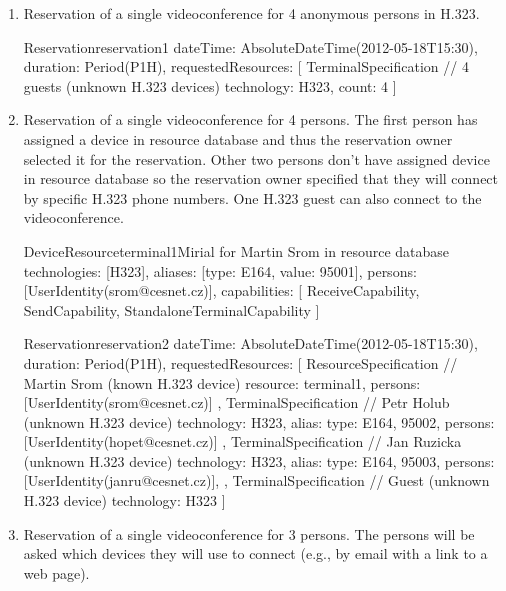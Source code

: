 \begin{enumerate}
\item Reservation of a single videoconference for 4 anonymous persons in H.323.

\begin{EntityExample}{Reservation}{reservation1}{}
dateTime: AbsoluteDateTime(2012-05-18T15:30), duration: Period(P1H),
requestedResources: [
  TerminalSpecification { // 4 guests (unknown H.323 devices)
    technology: H323,
    count: 4
  }
]
\end{EntityExample}

\item Reservation of a single videoconference for 4 persons. The first person  has assigned a device in resource database and thus the reservation owner selected it for the reservation. Other two persons don't have assigned device in resource database so the reservation owner specified that they will connect by specific H.323 phone numbers. One H.323 guest can also connect to the videoconference.

\begin{EntityExample}{DeviceResource}{terminal1}{Mirial for Martin Srom in resource database}
technologies: [H323], 
aliases: [{type: E164, value: 95001}],
persons: [UserIdentity(srom@cesnet.cz)],
capabilities: [
  ReceiveCapability, SendCapability, StandaloneTerminalCapability
]
\end{EntityExample}

\begin{EntityExample}{Reservation}{reservation2}{}
dateTime: AbsoluteDateTime(2012-05-18T15:30), duration: Period(P1H),
requestedResources: [
  ResourceSpecification { // Martin Srom (known H.323 device)
    resource: terminal1,
    persons: [UserIdentity(srom@cesnet.cz)] 
  },
  TerminalSpecification { // Petr Holub (unknown H.323 device)
    technology: H323,
    alias: {type: E164, 95002},
    persons: [UserIdentity(hopet@cesnet.cz)]
  },
  TerminalSpecification { // Jan Ruzicka (unknown H.323 device)
    technology: H323,
    alias: {type: E164, 95003},
    persons: [UserIdentity(janru@cesnet.cz)], 
  },
  TerminalSpecification { // Guest (unknown H.323 device)
    technology: H323
  }
]
\end{EntityExample}

\item Reservation of a single videoconference for 3 persons. The persons will be asked which devices they will use to connect (e.g., by email with a link to a web page).


\end{enumerate}
